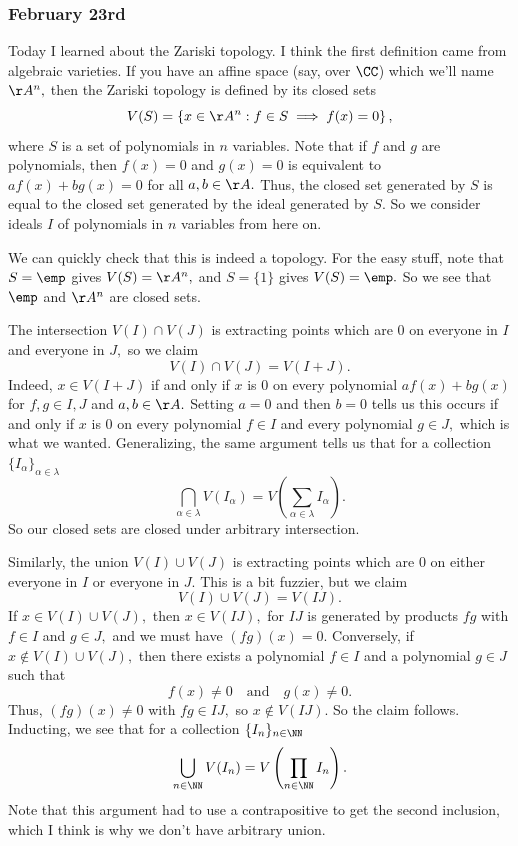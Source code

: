 \subsubsection{February 23rd}
Today I learned about the Zariski topology. I think the first definition came from algebraic varieties. If you have an affine space (say, over $\CC$) which we'll name $\AA^n,$ then the Zariski topology is defined by its closed sets
\[V(S)=\left\{x\in\AA^n:f\in S\implies f(x)=0\right\},\]
where $S$ is a set of polynomials in $n$ variables. Note that if $f$ and $g$ are polynomials, then $f(x)=0$ and $g(x)=0$ is equivalent to $af(x)+bg(x)=0$ for all $a,b\in\AA.$ Thus, the closed set generated by $S$ is equal to the closed set generated by the ideal generated by $S.$ So we consider ideals $I$ of polynomials in $n$ variables from here on.

We can quickly check that this is indeed a topology. For the easy stuff, note that $S=\emp$ gives $V(S)=\AA^n,$ and $S=\{1\}$ gives $V(S)=\emp.$ So we see that $\emp$ and $\AA^n$ are closed sets.

The intersection $V(I)\cap V(J)$ is extracting points which are $0$ on everyone in $I$ and everyone in $J,$ so we claim
\[V(I)\cap V(J)=V(I+J).\]
Indeed, $x\in V(I+J)$ if and only if $x$ is $0$ on every polynomial $af(x)+bg(x)$ for $f,g\in I,J$ and $a,b\in\AA.$ Setting $a=0$ and then $b=0$ tells us this occurs if and only if $x$ is $0$ on every polynomial $f\in I$ and every polynomial $g\in J,$ which is what we wanted. Generalizing, the same argument tells us that for a collection $\{I_\alpha\}_{\alpha\in\lambda}$
\[\bigcap_{\alpha\in\lambda}V(I_\alpha)=V\left(\sum_{\alpha\in\lambda}I_\alpha\right).\]
So our closed sets are closed under arbitrary intersection.

Similarly, the union $V(I)\cup V(J)$ is extracting points which are $0$ on either everyone in $I$ or everyone in $J.$ This is a bit fuzzier, but we claim
\[V(I)\cup V(J)=V(IJ).\]
If $x\in V(I)\cup V(J),$ then $x\in V(IJ),$ for $IJ$ is generated by products $fg$ with $f\in I$ and $g\in J,$ and we must have $(fg)(x)=0.$ Conversely, if $x\notin V(I)\cup V(J),$ then there exists a polynomial $f\in I$ and a polynomial $g\in J$ such that
\[f(x)\ne0\quad\text{and}\quad g(x)\ne0.\]
Thus, $(fg)(x)\ne0$ with $fg\in IJ,$ so $x\notin V(IJ).$ So the claim follows. Inducting, we see that for a collection $\{I_n\}_{n\in\NN}$
\[\bigcup_{n\in\NN}V(I_n)=V\left(\prod_{n\in\NN}I_n\right).\]
Note that this argument had to use a contrapositive to get the second inclusion, which I think is why we don't have arbitrary union.

